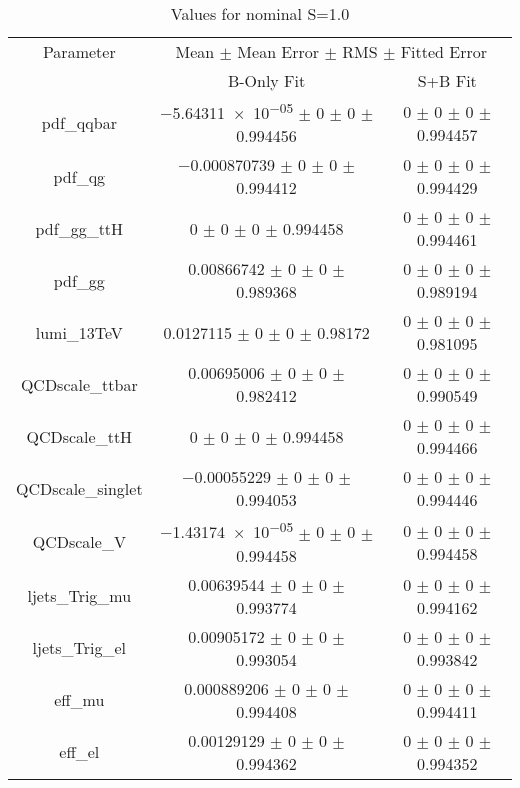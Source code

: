 \begin{table}
\centering
\caption{Values for nominal S=1.0}
\begin{tabular}{ccc}
\toprule
Parameter & \multicolumn{2}{c}{Mean $\pm$ Mean Error $\pm$ RMS $\pm$ Fitted Error}\\
 & B-Only Fit & S+B Fit\\
\midrule
pdf\_qqbar & \num{-5.64311e-05} $\pm$ \num{0} $\pm$ \num{0} $\pm$ \num{0.994456} & \num{0} $\pm$ \num{0} $\pm$ \num{0} $\pm$ \num{0.994457}\\
pdf\_qg & \num{-0.000870739} $\pm$ \num{0} $\pm$ \num{0} $\pm$ \num{0.994412} & \num{0} $\pm$ \num{0} $\pm$ \num{0} $\pm$ \num{0.994429}\\
pdf\_gg\_ttH & \num{0} $\pm$ \num{0} $\pm$ \num{0} $\pm$ \num{0.994458} & \num{0} $\pm$ \num{0} $\pm$ \num{0} $\pm$ \num{0.994461}\\
pdf\_gg & \num{0.00866742} $\pm$ \num{0} $\pm$ \num{0} $\pm$ \num{0.989368} & \num{0} $\pm$ \num{0} $\pm$ \num{0} $\pm$ \num{0.989194}\\
lumi\_13TeV & \num{0.0127115} $\pm$ \num{0} $\pm$ \num{0} $\pm$ \num{0.98172} & \num{0} $\pm$ \num{0} $\pm$ \num{0} $\pm$ \num{0.981095}\\
QCDscale\_ttbar & \num{0.00695006} $\pm$ \num{0} $\pm$ \num{0} $\pm$ \num{0.982412} & \num{0} $\pm$ \num{0} $\pm$ \num{0} $\pm$ \num{0.990549}\\
QCDscale\_ttH & \num{0} $\pm$ \num{0} $\pm$ \num{0} $\pm$ \num{0.994458} & \num{0} $\pm$ \num{0} $\pm$ \num{0} $\pm$ \num{0.994466}\\
QCDscale\_singlet & \num{-0.00055229} $\pm$ \num{0} $\pm$ \num{0} $\pm$ \num{0.994053} & \num{0} $\pm$ \num{0} $\pm$ \num{0} $\pm$ \num{0.994446}\\
QCDscale\_V & \num{-1.43174e-05} $\pm$ \num{0} $\pm$ \num{0} $\pm$ \num{0.994458} & \num{0} $\pm$ \num{0} $\pm$ \num{0} $\pm$ \num{0.994458}\\
ljets\_Trig\_mu & \num{0.00639544} $\pm$ \num{0} $\pm$ \num{0} $\pm$ \num{0.993774} & \num{0} $\pm$ \num{0} $\pm$ \num{0} $\pm$ \num{0.994162}\\
ljets\_Trig\_el & \num{0.00905172} $\pm$ \num{0} $\pm$ \num{0} $\pm$ \num{0.993054} & \num{0} $\pm$ \num{0} $\pm$ \num{0} $\pm$ \num{0.993842}\\
eff\_mu & \num{0.000889206} $\pm$ \num{0} $\pm$ \num{0} $\pm$ \num{0.994408} & \num{0} $\pm$ \num{0} $\pm$ \num{0} $\pm$ \num{0.994411}\\
eff\_el & \num{0.00129129} $\pm$ \num{0} $\pm$ \num{0} $\pm$ \num{0.994362} & \num{0} $\pm$ \num{0} $\pm$ \num{0} $\pm$ \num{0.994352}\\

\end{tabular}
\end{table}
